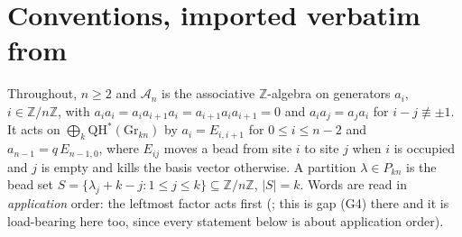 \documentclass[11pt]{article}
\theoremstyle{plain}
\theoremstyle{definition}
\newcommand{\A}{\mathscr{A}}
\newcommand{\QH}{\mathrm{QH}^*}
\newcommand{\Gr}{\mathrm{Gr}}
\newcommand{\ZZ}{\mathbb{Z}}
\newcommand{\bh}{\mathbf h}
\newcommand{\be}{\mathbf e}
\begin{document}
\begin{abstract}
Let $\A_n$ be Postnikov's affine nil-Temperley--Lieb algebra and let
$\mathcal R_e(t)=\sum_{J,\varepsilon}t^{|\varepsilon|}a_{J,\varepsilon}$ be the
height-graded cylindric $e$-ribbon adder, realised inside $\A_n[t]$ in
\cite{Clio201}.  We prove the cylindric splitting identity
\[
\sum_{b=0}^{e}t^{b}\,\bh_{e-b}\be_{b}
\;=\;\sum_{|I|=e}\ \sum_{\varepsilon}t^{|\varepsilon|}(1+t)^{r(I)}a_{I,\varepsilon}
\qquad(1\le e\le n-1),
\]
where $r(I)$ is the number of cyclic runs of $I\subseteq\ZZ/n\ZZ$.  The proof is
two observations about heaps: a horizontal-strip monomial \emph{empties} its own
support while a vertical-strip monomial \emph{requires} its support to be
occupied, so the two supports must be disjoint; and once they are disjoint, the
commutation class of the product is determined by which part each
\emph{edge-indexing} site lies in --- leaving the last site of each run free.
That free binary choice is the factor $(1+t)$.  Differentiating at $t=-1$ kills
every $I$ with two or more runs and yields the closed formula
$\mathcal R_e(-1)=\sum_{b\ge1}(-1)^{b-1}b\,\bh_{e-b}\be_b$, which exhibits
$\mathcal R_e(-1)$ as a quantum multiplication operator and proves the cylindric
Newton identity $r\,\bh_r=\sum_{e\le r}\mathcal R_e(-1)\bh_{r-e}$ for
$r\le n-1$, together with its defect $(-1)^{k-1}(n-k)q$ at $r=n$.  We also settle
the boundary cases $k\in\{1,n-1\}$: there $\mathcal R_e(t)$ is a \emph{monomial}
in $t$, so no value of $t$ is distinguished and the rigidity question is vacuous.
\end{abstract}

\section{Conventions, imported verbatim from \cite{Clio201}}\label{sec:conv}

Throughout, $n\ge2$ and $\A_n$ is the associative $\ZZ$-algebra on generators
$a_i$, $i\in\ZZ/n\ZZ$, with $a_ia_i=a_ia_{i+1}a_i=a_{i+1}a_ia_{i+1}=0$ and
$a_ia_j=a_ja_i$ for $i-j\not\equiv\pm1$.  It acts on
$\bigoplus_k\QH(\Gr_{kn})$ by $a_i=E_{i,i+1}$ for $0\le i\le n-2$ and
$a_{n-1}=q\,E_{n-1,0}$, where $E_{ij}$ moves a bead from site $i$ to site $j$
when $i$ is occupied and $j$ is empty and kills the basis vector otherwise.  A
partition $\lambda\in P_{kn}$ is the bead set
$S=\{\lambda_j+k-j:1\le j\le k\}\subseteq\ZZ/n\ZZ$, $|S|=k$.  Words are read in
\emph{application} order: the leftmost factor acts first
(\cite[\texttt{rem:conv}]{Clio201}; this is gap (G4) there and it is load-bearing here
too, since every statement below is about application order).
\end{document}
